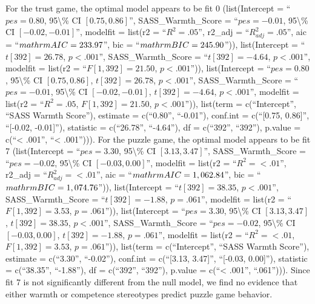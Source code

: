 \documentclass[
  doc,draftall]{apa6}
\begin{document}
For the trust game, the optimal model appears to be fit 0 (list(Intercept = ``\(pes = 0.80\), 95\textbackslash\% CI \([0.75, 0.86]\)'', SASS\_Warmth\_Score = ``\(pes = -0.01\), 95\textbackslash\% CI \([-0.02, -0.01]\)'', modelfit = list(r2 = ``\(R^2 = .05\)'', r2\_adj = ``\(R^2_{adj} = .05\)'', aic = ``\(\\mathrm{AIC} = 233.97\)'', bic = ``\(\\mathrm{BIC} = 245.90\)'')), list(Intercept = ``\(t[392] = 26.78\), \(p < .001\)'', SASS\_Warmth\_Score = ``\(t[392] = -4.64\), \(p < .001\)'', modelfit = list(r2 = ``\(F[1, 392] = 21.50\), \(p < .001\)'')), list(Intercept = ``\(pes = 0.80\), 95\textbackslash\% CI \([0.75, 0.86]\), \(t[392] = 26.78\), \(p < .001\)'', SASS\_Warmth\_Score = ``\(pes = -0.01\), 95\textbackslash\% CI \([-0.02, -0.01]\), \(t[392] = -4.64\), \(p < .001\)'', modelfit = list(r2 = ``\(R^2 = .05\), \(F[1, 392] = 21.50\), \(p < .001\)'')), list(term = c(``Intercept'', ``SASS Warmth Score''), estimate = c(``0.80'', ``-0.01''), conf.int = c(``{[}0.75, 0.86{]}'', ``{[}-0.02, -0.01{]}''), statistic = c(``26.78'', ``-4.64''), df = c(``392'', ``392''), p.value = c(``\textless{} .001'', ``\textless{} .001''))). For the puzzle game, the optimal model appears to be fit 7 (list(Intercept = ``\(pes = 3.30\), 95\textbackslash\% CI \([3.13, 3.47]\)'', SASS\_Warmth\_Score = ``\(pes = -0.02\), 95\textbackslash\% CI \([-0.03, 0.00]\)'', modelfit = list(r2 = ``\(R^2 = < .01\)'', r2\_adj = ``\(R^2_{adj} = < .01\)'', aic = ``\(\\mathrm{AIC} = 1,062.84\)'', bic = ``\(\\mathrm{BIC} = 1,074.76\)'')), list(Intercept = ``\(t[392] = 38.35\), \(p < .001\)'', SASS\_Warmth\_Score = ``\(t[392] = -1.88\), \(p = .061\)'', modelfit = list(r2 = ``\(F[1, 392] = 3.53\), \(p = .061\)'')), list(Intercept = ``\(pes = 3.30\), 95\textbackslash\% CI \([3.13, 3.47]\), \(t[392] = 38.35\), \(p < .001\)'', SASS\_Warmth\_Score = ``\(pes = -0.02\), 95\textbackslash\% CI \([-0.03, 0.00]\), \(t[392] = -1.88\), \(p = .061\)'', modelfit = list(r2 = ``\(R^2 = < .01\), \(F[1, 392] = 3.53\), \(p = .061\)'')), list(term = c(``Intercept'', ``SASS Warmth Score''), estimate = c(``3.30'', ``-0.02''), conf.int = c(``{[}3.13, 3.47{]}'', ``{[}-0.03, 0.00{]}''), statistic = c(``38.35'', ``-1.88''), df = c(``392'', ``392''), p.value = c(``\textless{} .001'', ``.061''))). Since fit 7 is not significantly different from the null model, we find no evidence that either warmth or competence stereotypes predict puzzle game behavior.
\end{document}
